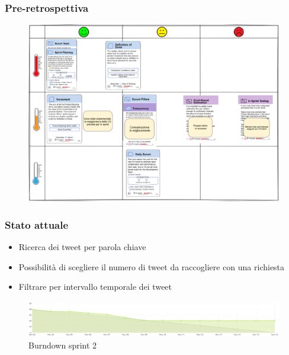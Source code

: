 \documentclass{beamer}
\begin{document}
\begin{frame}
  \frametitle{Pre-retrospettiva}
  \begin{figure}
    \centering
    \includegraphics[width=\textwidth]{./img/preretrospettiva.png}
  \end{figure}
\end{frame}

\begin{frame}
  \frametitle{Stato attuale}
  \begin{itemize}
    \item Ricerca dei tweet per parola chiave
    \item Possibilità di scegliere il numero di tweet da raccogliere con una richiesta
    \item Filtrare per intervallo temporale dei tweet
  \end{itemize}
  \begin{figure}
    \centering
    \includegraphics[width=\textwidth]{./img/burndown.png}
    \caption{Burndown sprint 2}
  \end{figure}
\end{frame}
\end{document}
